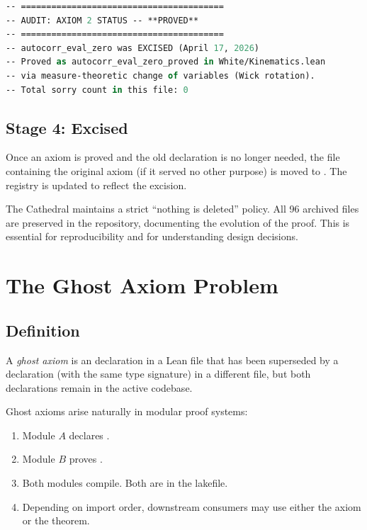 \documentclass[11pt,a4paper]{article}
\begin{document}
\begin{lstlisting}[language=ML,caption={Axiom elimination pattern}]
-- ========================================
-- AUDIT: AXIOM 2 STATUS -- **PROVED**
-- ========================================
-- autocorr_eval_zero was EXCISED (April 17, 2026)
-- Proved as autocorr_eval_zero_proved in White/Kinematics.lean
-- via measure-theoretic change of variables (Wick rotation).
-- Total sorry count in this file: 0
\end{lstlisting}

\subsection{Stage 4: Excised}

Once an axiom is proved and the old declaration is no longer needed,
the file containing the original axiom (if it served no other purpose)
is moved to . The registry is updated to reflect the
excision.

\begin{remark}
The Cathedral maintains a strict ``nothing is deleted'' policy. All
96 archived files are preserved in the repository, documenting the
evolution of the proof. This is essential for reproducibility and
for understanding design decisions.
\end{remark}

\section{The Ghost Axiom Problem}
\label{sec:ghost}

\subsection{Definition}

\begin{definition}
A \emph{ghost axiom} is an  declaration in a Lean file
that has been superseded by a  declaration (with the
same type signature) in a different file, but both declarations
remain in the active codebase.
\end{definition}

Ghost axioms arise naturally in modular proof systems:

\begin{enumerate}
  \item Module $A$ declares .
  \item Module $B$ proves .
  \item Both modules compile. Both are in the lakefile.
  \item Depending on import order, downstream consumers may use
    either the axiom or the theorem.
\end{enumerate}
\end{document}
